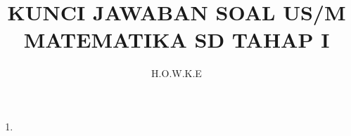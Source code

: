 \documentclass[12pt,a4paper]{article}
\author{H.O.W.K.E}
\title{KUNCI JAWABAN SOAL US/M MATEMATIKA SD TAHAP I }
\begin{document}
	\maketitle
	\begin{enumerate}
		\item 
	\end{enumerate}
\end{document}
